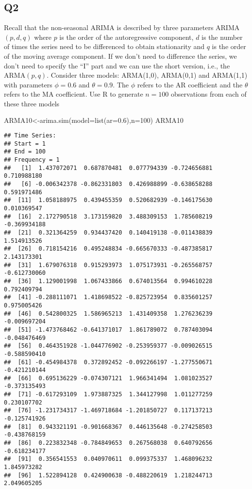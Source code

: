 \documentclass[
]{article}
\newenvironment{Shaded}{\begin{snugshade}}{\end{snugshade}}
\newcommand{\AttributeTok}[1]{\textcolor[rgb]{0.77,0.63,0.00}{#1}}
\newcommand{\DecValTok}[1]{\textcolor[rgb]{0.00,0.00,0.81}{#1}}
\newcommand{\FloatTok}[1]{\textcolor[rgb]{0.00,0.00,0.81}{#1}}
\newcommand{\FunctionTok}[1]{\textcolor[rgb]{0.00,0.00,0.00}{#1}}
\newcommand{\NormalTok}[1]{#1}
\newcommand{\OtherTok}[1]{\textcolor[rgb]{0.56,0.35,0.01}{#1}}
\begin{document}
\hypertarget{q2}{%
\subsection{Q2}\label{q2}}

Recall that the non-seasonal ARIMA is described by three parameters
ARIMA\((p,d,q)\) where \(p\) is the order of the autoregressive
component, \(d\) is the number of times the series need to be
differenced to obtain stationarity and \(q\) is the order of the moving
average component. If we don't need to difference the series, we don't
need to specify the ``I'' part and we can use the short version, i.e.,
the ARMA\((p,q)\). Consider three models: ARMA(1,0), ARMA(0,1) and
ARMA(1,1) with parameters \(\phi=0.6\) and \(\theta= 0.9\). The \(\phi\)
refers to the AR coefficient and the \(\theta\) refers to the MA
coefficient. Use R to generate \(n=100\) observations from each of these
three models

\begin{Shaded}
\begin{Highlighting}[]
\NormalTok{ARMA10}\OtherTok{\textless{}{-}}\FunctionTok{arima.sim}\NormalTok{(}\AttributeTok{model=}\FunctionTok{list}\NormalTok{(}\AttributeTok{ar=}\FloatTok{0.6}\NormalTok{),}\AttributeTok{n=}\DecValTok{100}\NormalTok{)}
\NormalTok{ARMA10}
\end{Highlighting}
\end{Shaded}

\begin{verbatim}
## Time Series:
## Start = 1 
## End = 100 
## Frequency = 1 
##   [1]  1.437072071  0.687870481  0.077794339 -0.724656881  0.710988180
##   [6] -0.006342378 -0.862331803  0.426988899 -0.638658288  0.591971486
##  [11]  1.058188975  0.439455359  0.520682939 -0.146175630  0.010369547
##  [16]  2.172790518  3.173159820  3.488309153  1.785608219 -0.369934188
##  [21]  0.321364259  0.934437420  0.140419138 -0.011438839  1.514913526
##  [26]  0.718154216  0.495248834 -0.665670333 -0.487385817  2.143173301
##  [31]  1.679076318  0.915293973  1.075173931 -0.265568757 -0.612730060
##  [36]  1.129001998  1.067433866  0.674013564  0.994610228  0.792409794
##  [41] -0.288111071  1.418698522 -0.825723954  0.835601257  0.975005426
##  [46]  0.542800325  1.586965213  1.431409358  1.276236239 -0.009697204
##  [51] -1.473768462 -0.641371017  1.861789072  0.787403094 -0.048476469
##  [56]  0.464351928 -1.044776902 -0.253959377 -0.009026515 -0.588590410
##  [61] -0.454984378  0.372892452 -0.092266197 -1.277550671 -0.421210144
##  [66]  0.695136229 -0.074307121  1.966341494  1.081023527 -0.373135493
##  [71] -0.617293109  1.973887325  1.344127998  1.011277259  0.230107702
##  [76] -1.231734317 -1.469718684 -1.201850727  0.117137213 -0.125741926
##  [81]  0.943321191 -0.901668367  0.446135648 -0.274258503 -0.438768159
##  [86]  0.223832348 -0.784849653  0.267568038  0.640792656 -0.618234177
##  [91]  0.356541553  0.040970611  0.099375337  1.468096232  1.845973282
##  [96]  1.522894128  0.424900638 -0.488220619  1.218244713  2.049605205
\end{verbatim}
\end{document}
